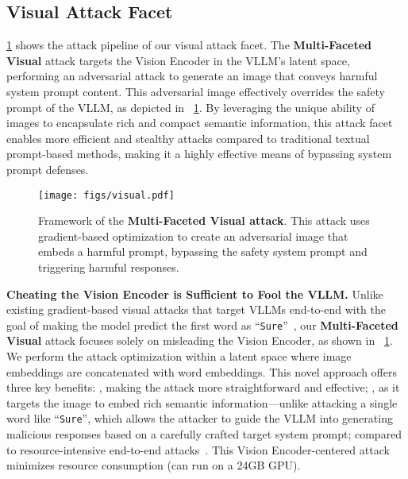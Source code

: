 \subsection{Visual Attack Facet}
\cref{fig:visual_attack} shows the attack pipeline of our visual attack facet. The \textbf{Multi-Faceted Visual} attack targets the Vision Encoder in the VLLM's latent space, performing an adversarial attack to generate an image that conveys harmful system prompt content. This adversarial image effectively overrides the safety prompt of the VLLM, as depicted in ~\cref{fig:visual_attack}. By leveraging the unique ability of images to encapsulate rich and compact semantic information, this attack facet enables more efficient and stealthy attacks compared to traditional textual prompt-based methods, making it a highly effective means of bypassing system prompt defenses.
\begin{figure}[t]
    \centering
    \texttt{[image: figs/visual.pdf]} \vspace{-5pt}
    \caption{Framework of the \textbf{Multi-Faceted Visual attack}. This attack uses gradient-based optimization to create an adversarial image that embeds a harmful prompt, bypassing the safety system prompt and triggering harmful responses.}
    \label{fig:visual_attack}
    \vspace{-20pt}
\end{figure}

\noindent\textbf{Cheating the Vision Encoder is Sufficient to Fool the VLLM.} Unlike existing gradient-based visual attacks that target VLLMs end-to-end with the goal of making the model predict the first word as ``\texttt{Sure}''~\cite{qi2023visual}, our \textbf{Multi-Faceted Visual} attack focuses solely on misleading the Vision Encoder, as shown in ~\cref{fig:visual_attack}. We perform the attack optimization within a latent space where image embeddings are concatenated with word embeddings. This novel approach offers three key benefits:  , making the attack more straightforward and effective;  , as it targets the image to embed rich semantic information—unlike attacking a single word like ``\texttt{Sure}'', which allows the attacker to guide the VLLM into generating malicious responses based on a carefully crafted target system prompt;   compared to resource-intensive end-to-end attacks~\cite{gcg, qi2023visual}. This Vision Encoder-centered attack minimizes resource consumption (can run on a 24GB GPU).

